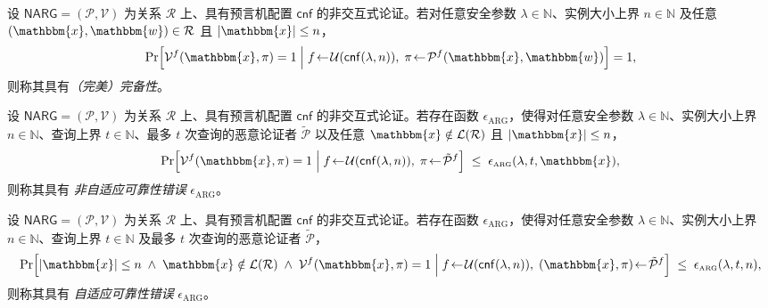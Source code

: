 \documentclass[american,singlepageview]{snargs-book-zh}
\newcommand{\Malicious}[1]{\tilde{#1}}
\newcommand{\SomeSize}[1]{|#1|}
\newcommand{\Naturals}{\mathbb{N}}
\newcommand{\Relation}{\mathcal{R}}
\newcommand{\Language}{\mathcal{L}}
\newcommand{\GetLanguage}[1]{\Language(#1)}
\newcommand{\Instance}{\mathbbm{x}}
\newcommand{\Witness}{\mathbbm{w}}
\newcommand{\InstanceSize}{n}
\newcommand{\ProtoProver}{P}
\newcommand{\ProtoVerifier}{V}
\newcommand{\ProtoSoundnessError}{\epsilon}
\newcommand{\NARGSymbol}{\mathsf{NARG}}
\newcommand{\ARGSubscript}{\scriptscriptstyle\mathrm{ARG}}
\newcommand{\ARGFormat}[1]{\mathcal{#1}}
\newcommand{\ARGOracles}{\mathsf{cnf}}
\newcommand{\ARGProver}{\ARGFormat{\ProtoProver}}
\newcommand{\ARGVerifier}{\ARGFormat{\ProtoVerifier}}
\newcommand{\ARGSystem}{(\ARGProver,\ARGVerifier)}
\newcommand{\ARGString}{\pi}
\newcommand{\ARGNASoundnessError}{\ProtoSoundnessError_{\ARGSubscript}}
\newcommand{\ARGSoundnessError}{\ProtoSoundnessError_{\ARGSubscript}}
\newcommand{\ROFunction}{f}
\newcommand{\ROQueryBound}{t}
\newcommand{\RODistribution}[1]{\mathcal{U}(#1)}
\newcommand{\SecurityParameter}{\lambda}
\begin{document}
\begin{definition}[完备性]
\label{definition:narg-completeness-with-cnf}
设 $\NARGSymbol=\ARGSystem$ 为关系 $\Relation$ 上、具有预言机配置 $\ARGOracles$ 的非交互式论证。若对任意安全参数 $\SecurityParameter\in\Naturals$、实例大小上界 $\InstanceSize\in\Naturals$ 及任意 $(\Instance,\Witness)\in\Relation$ 且 $\SomeSize{\Instance}\le\InstanceSize$，
\[
  \Pr\Bigl[
    \ARGVerifier^{\ROFunction}(\Instance,\ARGString)=1
    \;\Big|\;
    \ROFunction\!\gets\!\RODistribution{\ARGOracles(\SecurityParameter,\InstanceSize)},\;
    \ARGString\!\gets\!\ARGProver^{\ROFunction}(\Instance,\Witness)
  \Bigr]
  =1,
\]
则称其具有\emph{（完美）完备性}。
\end{definition}

\begin{definition}[非自适应可靠性]
\label{definition:narg-nonadaptive-soundness-with-cnf}
设 $\NARGSymbol=\ARGSystem$ 为关系 $\Relation$ 上、具有预言机配置 $\ARGOracles$ 的非交互式论证。若存在函数 $\ARGNASoundnessError$，使得对任意安全参数 $\SecurityParameter\in\Naturals$、实例大小上界 $\InstanceSize\in\Naturals$、查询上界 $\ROQueryBound\in\Naturals$、最多 $\ROQueryBound$ 次查询的恶意论证者 $\Malicious{\ARGProver}$ 以及任意 $\Instance\notin\GetLanguage{\Relation}$ 且 $\SomeSize{\Instance}\le\InstanceSize$，
\[
  \Pr\Bigl[
    \ARGVerifier^{\ROFunction}(\Instance,\ARGString)=1
    \;\Big|\;
    \ROFunction\!\gets\!\RODistribution{\ARGOracles(\SecurityParameter,\InstanceSize)},\;
    \ARGString\!\gets\!\Malicious{\ARGProver}^{\ROFunction}
  \Bigr]
  \;\le\;
  \ARGNASoundnessError(\SecurityParameter,\ROQueryBound,\Instance),
\]
则称其具有 \emph{非自适应可靠性错误} $\ARGNASoundnessError$。
\end{definition}

\begin{definition}[自适应可靠性]
\label{definition:narg-adaptive-soundness-with-cnf}
设 $\NARGSymbol=\ARGSystem$ 为关系 $\Relation$ 上、具有预言机配置 $\ARGOracles$ 的非交互式论证。若存在函数 $\ARGSoundnessError$，使得对任意安全参数 $\SecurityParameter\in\Naturals$、实例大小上界 $\InstanceSize\in\Naturals$、查询上界 $\ROQueryBound\in\Naturals$ 及最多 $\ROQueryBound$ 次查询的恶意论证者 $\Malicious{\ARGProver}$，
\[
  \Pr\Bigl[
    \SomeSize{\Instance}\le\InstanceSize
    \;\wedge\;
    \Instance\notin\GetLanguage{\Relation}
    \;\wedge\;
    \ARGVerifier^{\ROFunction}(\Instance,\ARGString)=1
    \;\Big|\;
    \ROFunction\!\gets\!\RODistribution{\ARGOracles(\SecurityParameter,\InstanceSize)},\;
    (\Instance,\ARGString)\!\gets\!\Malicious{\ARGProver}^{\ROFunction}
  \Bigr]
  \;\le\;
  \ARGSoundnessError(\SecurityParameter,\ROQueryBound,\InstanceSize),
\]
则称其具有 \emph{自适应可靠性错误} $\ARGSoundnessError$。
\end{definition}
\end{document}
